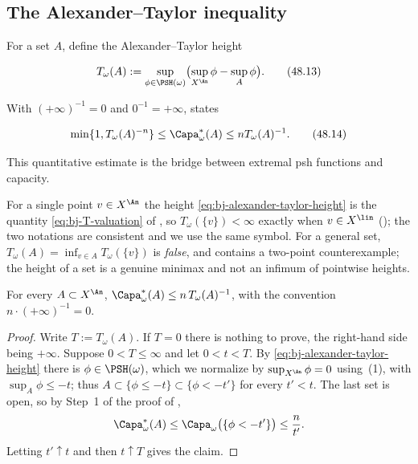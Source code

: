 \subsection{The Alexander--Taylor inequality}
\label{sec:ch48-alexander-taylor}

For a set $A$, define the Alexander--Taylor height

\[
 T_\omega(A):=\sup_{\phi\in\PSH(\omega)}
                   \bigl(\sup_{X^{\An}}\phi-\sup_A\phi\bigr).
\tag{48.13}\label{eq:bj-alexander-taylor-height}
\]

With $(+\infty)^{-1}=0$ and $0^{-1}=+\infty$, \cite[Theorem~13.14]{BJ22} states

\[
 \min\{1,T_\omega(A)^{-n}\}
 \leq\Capa_\omega^*(A)
 \leq nT_\omega(A)^{-1}.
\tag{48.14}\label{eq:bj-alexander-taylor}
\]

This quantitative estimate is the bridge between extremal psh functions
and capacity.

For a single point $v\in X^{\An}$ the height
\eqref{eq:bj-alexander-taylor-height} is the quantity
\eqref{eq:bj-T-valuation} of , so
$T_\omega(\{v\})<\infty$ exactly when $v\in X^{\lin}$
(); the two notations are consistent
and we use the same symbol.  For a general set,
$T_\omega(A)=\inf_{v\in A}T_\omega(\{v\})$ is \emph{false}, and
 contains a two-point counterexample; the height
of a set is a genuine minimax and not an infimum of pointwise heights.

\begin{proposition}
\label{prop:ch48-at-upper}
For every $A\subset X^{\An}$,
$\Capa^*_\omega(A)\le n\,T_\omega(A)^{-1}$, with the convention
$n\cdot(+\infty)^{-1}=0$.
\end{proposition}

\begin{proof}
Write $T:=T_\omega(A)$.  If $T=0$ there is nothing to prove, the
right-hand side being $+\infty$.  Suppose $0<T\le\infty$ and let
$0<t<T$.  By \eqref{eq:bj-alexander-taylor-height} there is
$\phi\in\PSH(\omega)$, which we normalize by $\sup_{X^{\An}}\phi=0$
using \,(1), with $\sup_A\phi\le-t$; thus
$A\subset\{\phi\le-t\}\subset\{\phi<-t'\}$ for every $t'<t$.  The last
set is open, so by Step~1 of the proof of
,
\[
 \Capa^*_\omega(A)\le\Capa_\omega\bigl(\{\phi<-t'\}\bigr)\le\frac n{t'} .
\]
Letting $t'\uparrow t$ and then $t\uparrow T$ gives the claim.
\end{proof}

